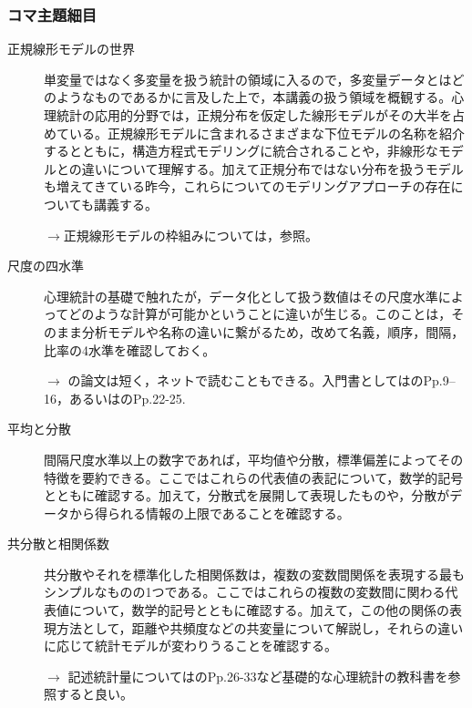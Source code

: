 \subsubsection{コマ主題細目}
\begin{description}
	\item[正規線形モデルの世界]単変量ではなく多変量を扱う統計の領域に入るので，多変量データとはどのようなものであるかに言及した上で，本講義の扱う領域を概観する。心理統計の応用的分野では，正規分布を仮定した線形モデルがその大半を占めている。正規線形モデルに含まれるさまざまな下位モデルの名称を紹介するとともに，構造方程式モデリングに統合されることや，非線形なモデルとの違いについて理解する。加えて正規分布ではない分布を扱うモデルも増えてきている昨今，これらについてのモデリングアプローチの存在についても講義する。
	      \begin{flushright}
		      $\to$正規線形モデルの枠組みについては，\citet{Minaka2018}参照。
	      \end{flushright}

	\item[尺度の四水準]心理統計の基礎で触れたが，データ化として扱う数値はその尺度水準によってどのような計算が可能かということに違いが生じる。このことは，そのまま分析モデルや名称の違いに繋がるため，改めて名義，順序，間隔，比率の4水準を確認しておく。
	      \begin{flushright}
		      $\to$ \citet{stevens1946}の論文は短く，ネットで読むこともできる。入門書としては\citet{Kawabata201408}のPp.9--16，あるいは\citet{Yamada2004}のPp.22-25.
	      \end{flushright}

	\item[平均と分散]間隔尺度水準以上の数字であれば，平均値や分散，標準偏差によってその特徴を要約できる。ここではこれらの代表値の表記について，数学的記号とともに確認する。加えて，分散式を展開して表現したものや，分散がデータから得られる情報の上限であることを確認する。

	\item[共分散と相関係数]共分散やそれを標準化した相関係数は，複数の変数間関係を表現する最もシンプルなものの1つである。ここではこれらの複数の変数間に関わる代表値について，数学的記号とともに確認する。加えて，この他の関係の表現方法として，距離や共頻度などの共変量について解説し，それらの違いに応じて統計モデルが変わりうることを確認する。

	      \begin{flushright}
		      $\to$ 記述統計量については\citet{Kawabata201408}のPp.26-33など基礎的な心理統計の教科書を参照すると良い。
	      \end{flushright}


\end{description}
